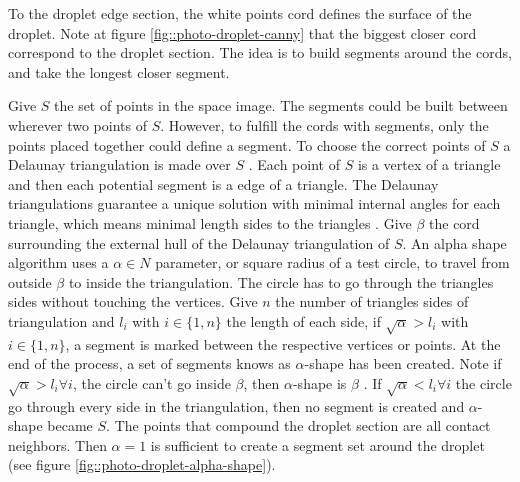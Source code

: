 \documentclass[12pt]{iopart}
\begin{document}
To the droplet edge section, the white points cord defines 
the surface of the droplet. Note at figure \ref{fig::photo-droplet-canny} that the biggest closer
 cord correspond to the droplet section. The idea is to build segments around
 the cords, and take the longest closer segment. 
                                
Give $S$ the set of points in the space image. The segments could 
be built between wherever two points of $S$. However, to fulfill
 the cords with segments, only the points placed together could define
 a segment. To choose the correct points of $S$ a Delaunay triangulation
 is made over $S$ \cite{CGAL}. Each point of $S$ is a vertex
of a triangle and then each potential segment is a edge of a triangle. 
The Delaunay triangulations guarantee a unique solution with minimal
 internal angles for each triangle, which means  minimal
 length sides to the triangles \cite{BERG}.
 Give $\beta$ the cord surrounding the external hull of the Delaunay
 triangulation of $S$. An alpha shape algorithm uses a $\alpha \in N$ parameter,
 or square radius of a test circle, to travel from outside $\beta$ to inside
 the triangulation. The circle has to go through the triangles sides without touching the vertices. Give 
$n$ the number of triangles sides of triangulation
and $l_{i}$ with $i\in\{1,n\}$ the length of each side, if $\sqrt{\alpha} > l_{i}$ 
with $i \in\{1,n\}$, a segment is marked between the respective vertices or
 points. At the end of the process, a  set of segments knows as $\alpha$-shape has been created.
  Note if $\sqrt{\alpha} > l_{i} \forall i$, the circle can't go inside $\beta$, then $\alpha$-shape
 is $\beta$ \cite{CGAL}. If $\sqrt{\alpha} < l_{i} \forall i$ the circle go through
 every side in the triangulation,  then no segment is created and $\alpha$-shape
 became $S$. The points that compound the droplet section are all contact neighbors. Then $\alpha = 1$
 is sufficient to create a segment set around the droplet
 (see figure \ref{fig::photo-droplet-alpha-shape}). 
                                  
\end{document}
